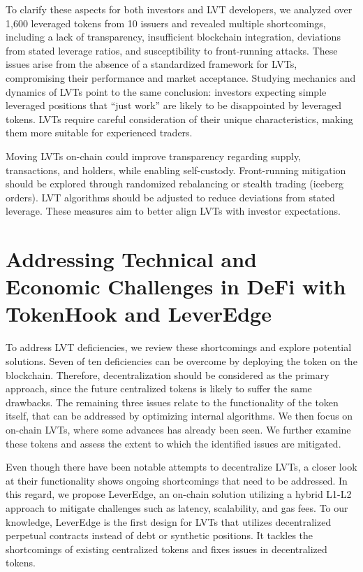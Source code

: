 To clarify these aspects for both investors and LVT developers, we analyzed over 1,600 leveraged tokens from 10 issuers and revealed multiple shortcomings, including a lack of transparency, insufficient blockchain integration, deviations from stated leverage ratios, and susceptibility to front-running attacks. These issues arise from the absence of a standardized framework for LVTs, compromising their performance and market acceptance. Studying mechanics and dynamics of LVTs point to the same conclusion: investors expecting simple leveraged positions that ``just work'' are likely to be disappointed by leveraged tokens. LVTs require careful consideration of their unique characteristics, making them more suitable for experienced traders.

Moving LVTs on-chain could improve transparency regarding supply, transactions, and holders, while enabling self-custody. Front-running mitigation should be explored through randomized rebalancing or stealth trading (\eg iceberg orders). LVT algorithms should be adjusted to reduce deviations from stated leverage. These measures aim to better align LVTs with investor expectations.

\section{Addressing Technical and Economic Challenges in DeFi with TokenHook and LeverEdge}
To address LVT deficiencies, we review these shortcomings and explore potential solutions. Seven of ten deficiencies can be overcome by deploying the token on the blockchain. Therefore, decentralization should be considered as the primary approach, since the future centralized tokens is likely to suffer the same drawbacks. The remaining three issues relate to the functionality of the token itself, that can be addressed by optimizing internal algorithms. We then focus on on-chain LVTs, where some advances has already been seen. We further examine these tokens and assess the extent to which the identified issues are mitigated.

Even though there have been notable attempts to decentralize LVTs, a closer look at their functionality shows ongoing shortcomings that need to be addressed. In this regard, we propose LeverEdge, an on-chain solution utilizing a hybrid L1-L2 approach to mitigate challenges such as latency, scalability, and gas fees. To our knowledge, LeverEdge is the first design for LVTs that utilizes decentralized perpetual contracts instead of debt or synthetic positions. It tackles the shortcomings of existing centralized tokens and fixes issues in decentralized tokens.

